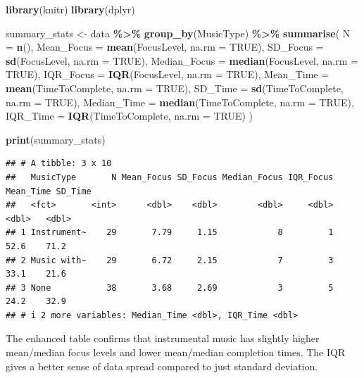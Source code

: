 \documentclass[
]{article}
\newenvironment{Shaded}{\begin{snugshade}}{\end{snugshade}}
\newcommand{\AttributeTok}[1]{\textcolor[rgb]{0.13,0.29,0.53}{#1}}
\newcommand{\ConstantTok}[1]{\textcolor[rgb]{0.56,0.35,0.01}{#1}}
\newcommand{\FunctionTok}[1]{\textcolor[rgb]{0.13,0.29,0.53}{\textbf{#1}}}
\newcommand{\NormalTok}[1]{#1}
\newcommand{\OtherTok}[1]{\textcolor[rgb]{0.56,0.35,0.01}{#1}}
\newcommand{\SpecialCharTok}[1]{\textcolor[rgb]{0.81,0.36,0.00}{\textbf{#1}}}
\begin{document}
\begin{Shaded}
\begin{Highlighting}[]
\FunctionTok{library}\NormalTok{(knitr)}
\FunctionTok{library}\NormalTok{(dplyr)}

\NormalTok{summary\_stats }\OtherTok{\textless{}{-}}\NormalTok{ data }\SpecialCharTok{\%\textgreater{}\%}
  \FunctionTok{group\_by}\NormalTok{(MusicType) }\SpecialCharTok{\%\textgreater{}\%}
  \FunctionTok{summarise}\NormalTok{(}
    \AttributeTok{N =} \FunctionTok{n}\NormalTok{(),}
    \AttributeTok{Mean\_Focus =} \FunctionTok{mean}\NormalTok{(FocusLevel, }\AttributeTok{na.rm =} \ConstantTok{TRUE}\NormalTok{),}
    \AttributeTok{SD\_Focus =} \FunctionTok{sd}\NormalTok{(FocusLevel, }\AttributeTok{na.rm =} \ConstantTok{TRUE}\NormalTok{),}
    \AttributeTok{Median\_Focus =} \FunctionTok{median}\NormalTok{(FocusLevel, }\AttributeTok{na.rm =} \ConstantTok{TRUE}\NormalTok{),}
    \AttributeTok{IQR\_Focus =} \FunctionTok{IQR}\NormalTok{(FocusLevel, }\AttributeTok{na.rm =} \ConstantTok{TRUE}\NormalTok{),}
    \AttributeTok{Mean\_Time =} \FunctionTok{mean}\NormalTok{(TimeToComplete, }\AttributeTok{na.rm =} \ConstantTok{TRUE}\NormalTok{),}
    \AttributeTok{SD\_Time =} \FunctionTok{sd}\NormalTok{(TimeToComplete, }\AttributeTok{na.rm =} \ConstantTok{TRUE}\NormalTok{),}
    \AttributeTok{Median\_Time =} \FunctionTok{median}\NormalTok{(TimeToComplete, }\AttributeTok{na.rm =} \ConstantTok{TRUE}\NormalTok{),}
    \AttributeTok{IQR\_Time =} \FunctionTok{IQR}\NormalTok{(TimeToComplete, }\AttributeTok{na.rm =} \ConstantTok{TRUE}\NormalTok{)}
\NormalTok{  )}

\FunctionTok{print}\NormalTok{(summary\_stats)}
\end{Highlighting}
\end{Shaded}

\begin{verbatim}
## # A tibble: 3 x 10
##   MusicType       N Mean_Focus SD_Focus Median_Focus IQR_Focus Mean_Time SD_Time
##   <fct>       <int>      <dbl>    <dbl>        <dbl>     <dbl>     <dbl>   <dbl>
## 1 Instrument~    29       7.79     1.15            8         1      52.6    71.2
## 2 Music with~    29       6.72     2.15            7         3      33.1    21.6
## 3 None           38       3.68     2.69            3         5      24.2    32.9
## # i 2 more variables: Median_Time <dbl>, IQR_Time <dbl>
\end{verbatim}

The enhanced table confirms that instrumental music has slightly higher
mean/median focus levels and lower mean/median completion times. The IQR
gives a better sense of data spread compared to just standard deviation.
\end{document}
